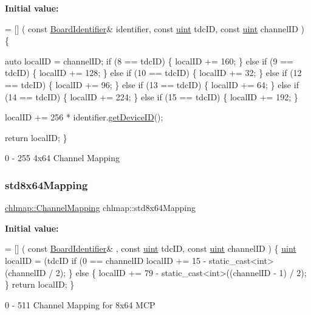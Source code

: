 {\bfseries Initial value\+:}
\begin{DoxyCode}
= [] (
    \textcolor{keyword}{const} \hyperlink{class_board_identifier}{BoardIdentifier}& identifier,
    \textcolor{keyword}{const} \hyperlink{_packet_8cpp_a69aa29b598b851b0640aa225a9e5d61d}{uint} tdcID,
    \textcolor{keyword}{const} \hyperlink{_packet_8cpp_a69aa29b598b851b0640aa225a9e5d61d}{uint} channelID
) \{
    
    
    \textcolor{keyword}{auto} localID = channelID;
    \textcolor{keywordflow}{if} (8 == tdcID) \{
        localID += 160;
    \} \textcolor{keywordflow}{else} \textcolor{keywordflow}{if} (9 == tdcID) \{
        localID += 128;
    \} \textcolor{keywordflow}{else} \textcolor{keywordflow}{if} (10 == tdcID) \{
        localID += 32;
    \} \textcolor{keywordflow}{else} \textcolor{keywordflow}{if} (12 == tdcID) \{
        localID += 96;
    \} \textcolor{keywordflow}{else} \textcolor{keywordflow}{if} (13 == tdcID) \{
        localID += 64;
    \} \textcolor{keywordflow}{else} \textcolor{keywordflow}{if} (14 == tdcID) \{
        localID += 224;
    \} \textcolor{keywordflow}{else} \textcolor{keywordflow}{if} (15 == tdcID) \{
        localID += 192;
    \}

    localID += 256 * identifier.\hyperlink{class_board_identifier_a8f3d818c08107a42fe9305607be38a3b}{getDeviceID}();

    \textcolor{keywordflow}{return} localID;
\}
\end{DoxyCode}


0 -\/ 255 4x64 Channel Mapping 

\mbox{\label{namespacechlmap_a11d7121de30a32ead9032c59221b7442}} 
\subsubsection{\texorpdfstring{std8x64\+Mapping}{std8x64Mapping}}
{\footnotesize\ttfamily \hyperlink{namespacechlmap_a5bb86fec567a6f1a0646881a9284bb01}{chlmap\+::\+Channel\+Mapping} chlmap\+::std8x64\+Mapping}

{\bfseries Initial value\+:}
\begin{DoxyCode}
= [] (
    \textcolor{keyword}{const} \hyperlink{class_board_identifier}{BoardIdentifier}& ,
    \textcolor{keyword}{const} \hyperlink{_packet_8cpp_a69aa29b598b851b0640aa225a9e5d61d}{uint} tdcID,
    \textcolor{keyword}{const} \hyperlink{_packet_8cpp_a69aa29b598b851b0640aa225a9e5d61d}{uint} channelID
) \{
    \hyperlink{_packet_8cpp_a69aa29b598b851b0640aa225a9e5d61d}{uint} localID = (tdcID%
    \textcolor{keywordflow}{if} (0 == channelID%
        localID += 15 - \textcolor{keyword}{static\_cast<}\textcolor{keywordtype}{int}\textcolor{keyword}{>}(channelID / 2); 
    \} \textcolor{keywordflow}{else} \{
        localID += 79 - \textcolor{keyword}{static\_cast<}\textcolor{keywordtype}{int}\textcolor{keyword}{>}((channelID - 1) / 2); 
    \}
    \textcolor{keywordflow}{return} localID;
\}
\end{DoxyCode}


0 -\/ 511 Channel Mapping for 8x64 M\+CP 

